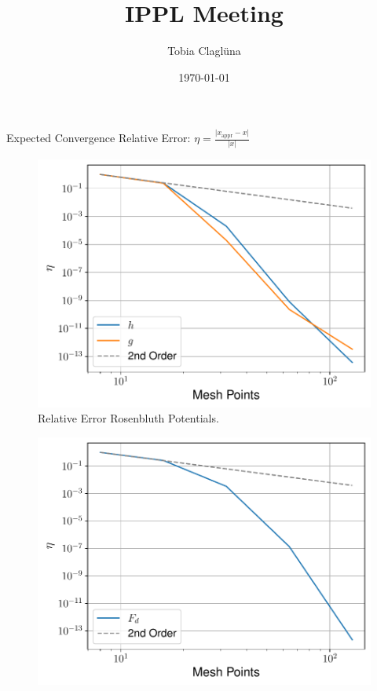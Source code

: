 

\title[\today]{IPPL Meeting}

\author{Tobia Claglüna}
\date{\today}
\def \myEmail {tobia.clagluena@psi.ch}





\begin{frame}[c]{Expected Convergence}
    Relative Error: $\eta = \frac{\lvert x_{\text{appr}}-x \rvert}{\lvert x \rvert}$
    \begin{multicols}{2}
    \begin{figure}[!htb]
        \centering
        \captionsetup{justification=centering}
      \includegraphics[width=1.05\linewidth]{figures/rb_potentials_convergence_sigma20.pdf}
      \caption{Relative Error Rosenbluth Potentials.}
      \label{fig:rb_potentials_convergence}
    \end{figure}
    \columnbreak
    \begin{figure}[!htb]
        \centering
        \captionsetup{justification=centering}
      \includegraphics[width=1.05\linewidth]{figures/Fd_convergence_sigma20.pdf}

\end{figure}
\end{multicols}
\end{frame}
